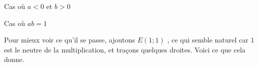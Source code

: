 \begin{center}
	\smallskip
	Cas où $a < 0$ et $b > 0$

	\medskip

	
	\smallskip
	Cas où $a b = 1$
\end{center}


\newpage

Pour mieux voir ce qu'il se passe, ajoutons $E(1 ; 1)$ , ce qui semble naturel car $1$ est le neutre de la multiplication, et traçons quelques droites. Voici ce que cela donne.

